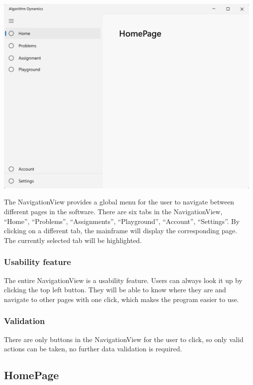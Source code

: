 \documentclass[a4paper]{report}
\begin{document}
\includegraphics[width=\textwidth, height=\textheight, keepaspectratio]{NavigationView-design}

The NavigationView provides a global menu for the user to navigate between different pages in the software. There are six tabs in the NavigationView, ``Home'', ``Problems'', ``Assignments'', ``Playground'', ``Account'', ``Settings''. By clicking on a different tab, the mainframe will display the corresponding page. The currently selected tab will be highlighted.

\subsubsection{Usability feature}

The entire NavigationView is a usability feature. Users can always look it up by clicking the top left button. They will be able to know where they are and navigate to other pages with one click, which makes the program easier to use.

\subsubsection{Validation}

There are only buttons in the NavigationView for the user to click, so only valid actions can be taken, no further data validation is required.

\subsection{HomePage}
\label{sec:HomePageDesign}
\end{document}
